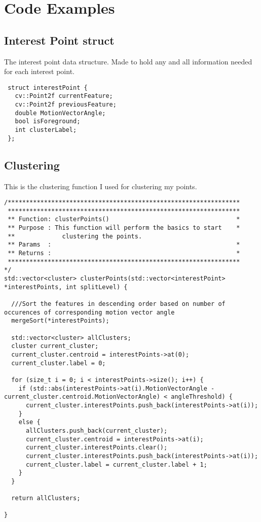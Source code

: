 \chapter{Code Examples}

\section{Interest Point struct}

The interest point data structure. Made to hold any and all information needed for each interest point.

\begin{verbatim}
 struct interestPoint {
   cv::Point2f currentFeature;
   cv::Point2f previousFeature;
   double MotionVectorAngle;
   bool isForeground;
   int clusterLabel;
 };
\end{verbatim}

\section{Clustering}
This is the clustering function I used for clustering my points.

\begin{verbatim}
/****************************************************************
 ****************************************************************
 ** Function: clusterPoints()                                   *
 ** Purpose : This function will perform the basics to start    *
 **             clustering the points.
 ** Params  : 							                        *
 ** Returns : 							                     	*
 ****************************************************************
*/
std::vector<cluster> clusterPoints(std::vector<interestPoint> *interestPoints, int splitLevel) {

  ///Sort the features in descending order based on number of occurences of corresponding motion vector angle
  mergeSort(*interestPoints);

  std::vector<cluster> allClusters;
  cluster current_cluster;
  current_cluster.centroid = interestPoints->at(0);
  current_cluster.label = 0;

  for (size_t i = 0; i < interestPoints->size(); i++) {
    if (std::abs(interestPoints->at(i).MotionVectorAngle - current_cluster.centroid.MotionVectorAngle) < angleThreshold) {
      current_cluster.interestPoints.push_back(interestPoints->at(i));
    }
    else {
      allClusters.push_back(current_cluster);
      current_cluster.centroid = interestPoints->at(i);
      current_cluster.interestPoints.clear();
      current_cluster.interestPoints.push_back(interestPoints->at(i));
      current_cluster.label = current_cluster.label + 1;
    }
  }

  return allClusters;

}
\end{verbatim}